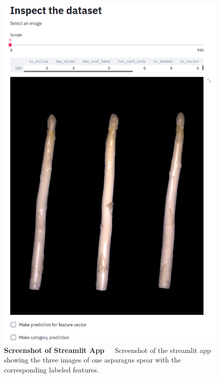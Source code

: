 \begin{figure}[!htb]
	\centering
	\includegraphics[scale=0.4]{Figures/chapter04/ftl_streamlit_app.png}
	\decoRule
	\caption[Screenshot of the Streamlit App]{\textbf{Screenshot of Streamlit App}~~~Screenshot of the streamlit app showing the three images of one asparagus spear with the corresponding labeled features.}
    \label{fig:FeaturetoLabelStreamlitApp}
\end{figure}    

